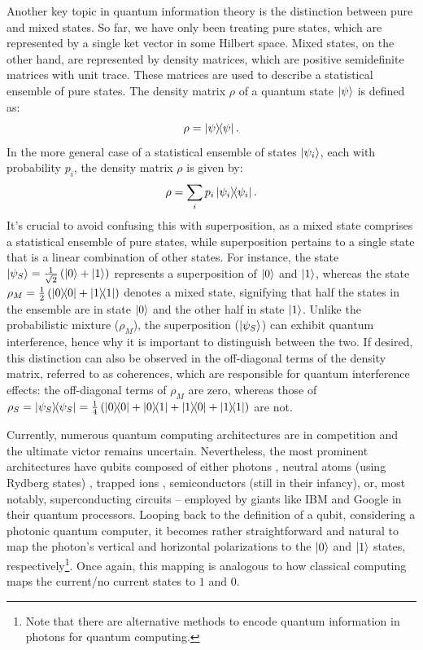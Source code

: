 Another key topic in quantum information theory is the distinction between pure and mixed states. So far, we have only been treating pure states, which are represented by a single ket vector in some Hilbert space. Mixed states, on the other hand, are represented by density matrices, which are positive semidefinite matrices with unit trace. These matrices are used to describe a statistical ensemble of pure states. The density matrix $\rho$ of a quantum state $\ket{\psi}$ is defined as:
\begin{equation}
  \rho = \dyad{\psi}{\psi}.
\end{equation}
In the more general case of a statistical ensemble of states $\ket{\psi_i}$, each with probability $p_i$, the density matrix $\rho$ is given by:
\begin{equation}
  \rho = \sum_i p_i \dyad{\psi_i}{\psi_i}.
\end{equation}
It's crucial to avoid confusing this with superposition, as a mixed state comprises a statistical ensemble of pure states, while superposition pertains to a single state that is a linear combination of other states. For instance, the state $\ket{\psi_S} = \frac{1}{\sqrt{2}}\left(\ket{0} + \ket{1}\right)$ represents a superposition of $\ket{0}$ and $\ket{1}$, whereas the state $\rho_M = \frac{1}{2}\left(\dyad{0}{0} + \dyad{1}{1}\right)$ denotes a mixed state, signifying that half the states in the ensemble are in state $\ket{0}$ and the other half in state $\ket{1}$. Unlike the probabilistic mixture ($\rho_M$), the superposition ($\ket{\psi_S}$) can exhibit quantum interference, hence why it is important to distinguish between the two. If desired, this distinction can also be observed in the off-diagonal terms of the density matrix, referred to as coherences, which are responsible for quantum interference effects: the off-diagonal terms of $\rho_{M}$ are zero, whereas those of $\rho_{S} = \dyad{\psi_S}{\psi_S} = \frac{1}{4}\left(\dyad{0}{0} + \dyad{0}{1} + \dyad{1}{0} + \dyad{1}{1}\right)$ are not.

Currently, numerous quantum computing architectures are in competition and the ultimate victor remains uncertain. Nevertheless, the most prominent architectures have qubits composed of either photons \cite{slussarenko2019photonic, Xanadu_Photonics}, neutral atoms (using Rydberg states) \cite{Henriet2020quantumcomputing, Wu_2021}, trapped ions \cite{bruzewicz2019trapped}, semiconductors (still in their infancy), or, most notably, superconducting circuits \cite{Huang_2020, SC_Qubits} – employed by giants like IBM and Google in their quantum processors. Looping back to the definition of a qubit, considering a photonic quantum computer, it becomes rather straightforward and natural to map the photon's vertical and horizontal polarizations to the $\ket{0}$ and $\ket{1}$ states, respectively\footnote{Note that there are alternative methods to encode quantum information in photons for quantum computing.}. Once again, this mapping is analogous to how classical computing maps the current/no current states to $1$ and $0$.

